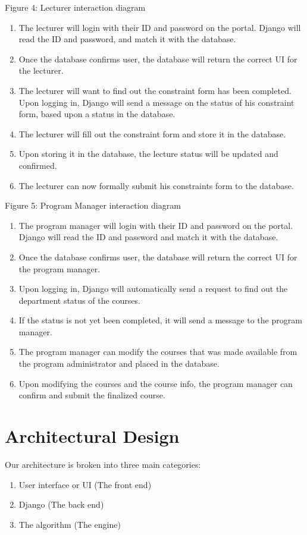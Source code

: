 \documentclass[12pt,article]{memoir}
\begin{document}

 Figure 4: Lecturer interaction diagram

\begin{enumerate}
\item The lecturer will login with their ID and password on the portal. Django will read the ID and password, and match it with the database. 
\item Once the database confirms user, the database will return the correct UI for the lecturer.
\item The lecturer will want to find out the constraint form has been completed. Upon logging in, Django will send a message on the status of his constraint form, based upon a status in the database.
\item The lecturer will fill out the constraint form and store it in the database.
\item Upon storing it in the database, the lecture status will be updated and confirmed. 
\item The lecturer can now formally submit his constraints form to the database. 
\end{enumerate}

 
 Figure 5: Program Manager interaction diagram

\begin{enumerate}
\item The program manager will login with their ID and password on the portal. Django will read the ID and password and match it with the database. 
\item Once the database confirms user, the database will return the correct UI for the program manager.
\item Upon logging in, Django will automatically send a request to find out the department status of the courses. 
\item If the status is not yet been completed, it will send a message to the program manager.
\item The program manager can modify the courses that was made available from the program administrator and placed in the database. 
\item Upon modifying the courses and the course info, the program manager can confirm and submit the finalized course. 
\end{enumerate}


\chapter{Architectural Design} %
Our architecture is broken into three main categories:
\begin{enumerate}
\item User interface or UI (The front end)
\item Django (The back end)
\item The algorithm (The engine)
\end{enumerate}
\end{document}
